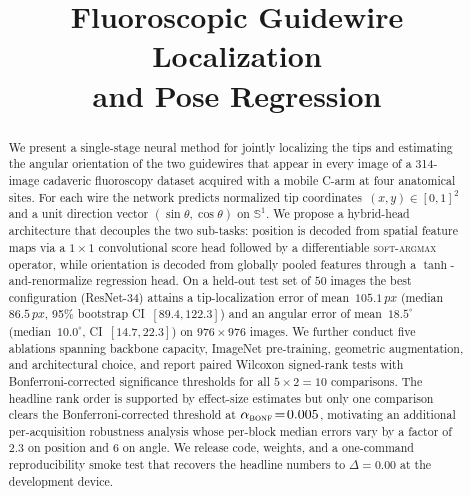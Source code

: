 \documentclass[conference,10pt,letterpaper]{IEEEtran}
\newcommand{\rnt}{ResNet-34}
\newcommand{\softargmax}{\textsc{soft-argmax}}
\newcommand{\px}{\,px}
\begin{document}
\title{Fluoroscopic Guidewire Localization\\and Pose Regression}

\author{
}

\maketitle

\begin{abstract}
We present a single-stage neural method for jointly localizing the tips and
estimating the angular orientation of the two guidewires that appear in
every image of a 314-image cadaveric fluoroscopy dataset acquired with a
mobile C-arm at four anatomical sites. For each wire the network predicts
normalized tip coordinates~$(x,y)\in[0,1]^2$ and a unit direction vector
$(\sin\theta,\cos\theta)$ on $\mathbb{S}^1$. We propose a hybrid-head
architecture that decouples the two sub-tasks: position is decoded from
spatial feature maps via a $1{\times}1$ convolutional score head followed
by a differentiable \softargmax{} operator, while orientation is decoded
from globally pooled features through a $\tanh{}$-and-renormalize regression
head. On a held-out test set of $50$ images the best configuration
(\rnt{}) attains a tip-localization error of mean~$105.1\px$
(median~$86.5\px$, 95\% bootstrap CI~$[89.4,122.3]$) and an angular error
of mean~$18.5^\circ$ (median~$10.0^\circ$, CI~$[14.7,22.3]$) on
$976{\times}976$ images. We further conduct five ablations
spanning backbone capacity, ImageNet pre-training, geometric augmentation,
and architectural choice, and report paired Wilcoxon signed-rank tests
with Bonferroni-corrected significance thresholds for all
$5{\times}2{=}10$ comparisons. The headline rank order is supported by
effect-size estimates but only one comparison clears the
Bonferroni-corrected threshold at $\alpha_\textsc{bonf}\!=\!0.005$,
motivating an additional per-acquisition robustness analysis whose
per-block median errors vary by a factor of $2.3$ on position and $6$ on
angle. We release code, weights, and a one-command reproducibility smoke
test that recovers the headline numbers to $\Delta\!=\!0.00$ at the
development device.
\end{abstract}
\end{document}

